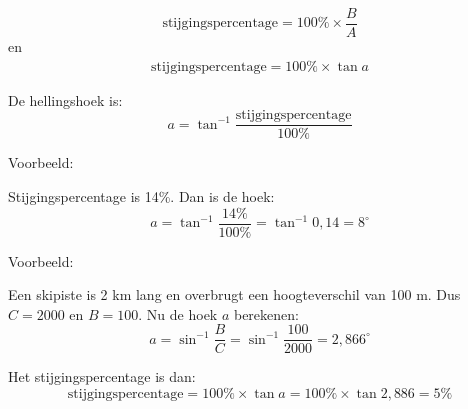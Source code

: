 \documentclass[12pt,fleqn]{article}
\begin{document}
\begin{equation}
\text{stijgingspercentage} = 100\% \times \dfrac{B}{A}
\end{equation}
en
\begin{eqnarray}
\text{stijgingspercentage} = 100\% \times \tan a
\end{eqnarray}

De hellingshoek is:
\begin{equation}
a = \tan^{-1} \dfrac{\text{stijgingspercentage}}{100\%}
\end{equation}

Voorbeeld:

Stijgingspercentage is 14\%. Dan is de hoek:
\begin{equation}
a = \tan^{-1} \dfrac{14\%}{100\%} = \tan^{-1} 0,14 = 8^\circ
\end{equation}

Voorbeeld:

Een skipiste is 2 km lang en overbrugt een hoogteverschil van 100 m. Dus $C=2000$ en $B=100$. Nu de hoek $a$ berekenen:
\begin{equation}
a = \sin^{-1} \dfrac{B}{C} = \sin^{-1} \dfrac{100}{2000} = 2,866^\circ
\end{equation}

Het stijgingspercentage is dan:
%
\begin{equation}
\text{stijgingspercentage} = 100\% \times \tan a = 100\% \times \tan 2,886 = 5\%
\end{equation}
\end{document}
